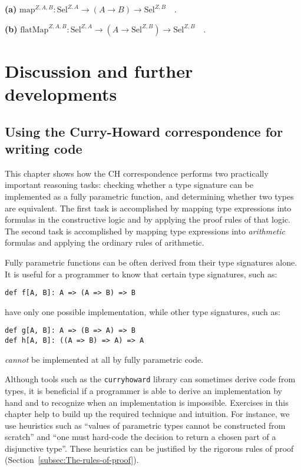 \textbf{(a)} $\text{map}^{Z,A,B}:\text{Sel}^{Z,A}\rightarrow\left(A\rightarrow B\right)\rightarrow\text{Sel}^{Z,B}\quad.$

\textbf{(b)} $\text{flatMap}^{Z,A,B}:\text{Sel}^{Z,A}\rightarrow(A\rightarrow\text{Sel}^{Z,B})\rightarrow\text{Sel}^{Z,B}\quad.$

\section{Discussion and further developments}

\subsection{Using the Curry-Howard correspondence for writing code}

This chapter shows how the CH correspondence performs two practically
important reasoning tasks: checking whether a type signature can be
implemented as a fully parametric function, and determining whether
two types are equivalent. The first task is accomplished by mapping
type expressions into formulas in the constructive logic and by applying
the proof rules of that logic. The second task is accomplished by
mapping type expressions into \emph{arithmetic} formulas and applying
the ordinary rules of arithmetic.

Fully parametric functions can be often derived from their type signatures
alone. It is useful for a programmer to know that certain type signatures,
such as:
\begin{lstlisting}
def f[A, B]: A => (A => B) => B
\end{lstlisting}
have only one possible implementation, while other type signatures,
such as:
\begin{lstlisting}
def g[A, B]: A => (B => A) => B
def h[A, B]: ((A => B) => A) => A
\end{lstlisting}
\emph{cannot} be implemented at all by fully parametric code.

Although tools such as the \texttt{curryhoward} library can sometimes
derive code from types, it is beneficial if a programmer is able to
derive an implementation by hand and to recognize when an implementation
is impossible. Exercises in this chapter help to build up the required
technique and intuition. For instance, we use heuristics such as \textsf{``}values
of parametric types cannot be constructed from scratch\textsf{''} and \textsf{``}one
must hard-code the decision to return a chosen part of a disjunctive
type\textsf{''}. These heuristics can be justified by the rigorous rules of
proof (Section~\ref{subsec:The-rules-of-proof}). 

